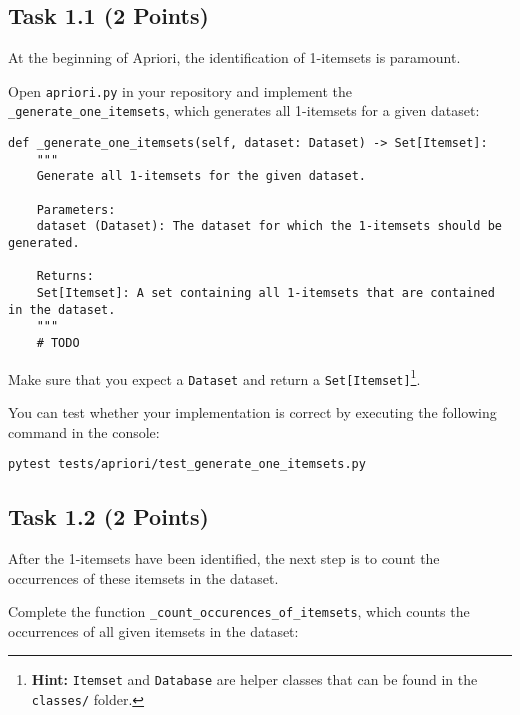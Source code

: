 \documentclass[
english,
smallborders
]{i6prcsht}
\newcommand{\points}[1]{\hfill \color{red}(#1 Points)\color{black}}
\begin{document}
\subsection*{Task 1.1 \points{2}}

At the beginning of Apriori, the identification of 1-itemsets is paramount.

Open \texttt{apriori.py} in your repository and implement the \texttt{\_generate\_one\_itemsets}, which generates all 1-itemsets for a given dataset:

\vspace*{0.3cm}

\begin{lstlisting}
def _generate_one_itemsets(self, dataset: Dataset) -> Set[Itemset]:
	"""
	Generate all 1-itemsets for the given dataset.

	Parameters:
	dataset (Dataset): The dataset for which the 1-itemsets should be generated.

	Returns:
	Set[Itemset]: A set containing all 1-itemsets that are contained in the dataset.
	"""
	# TODO
\end{lstlisting}

\vspace*{0.1cm}

Make sure that you expect a \texttt{Dataset} and return a \texttt{Set[Itemset]}\footnote{\textbf{Hint:} \texttt{Itemset} and \texttt{Database} are helper classes that can be found in the \texttt{classes/} folder.}.

You can test whether your implementation is correct by executing the following command in the console:

\vspace*{0.3cm}

\begin{lstlisting}
pytest tests/apriori/test_generate_one_itemsets.py
\end{lstlisting}

\vspace*{0.1cm}

\subsection*{Task 1.2 \points{2}}

After the 1-itemsets have been identified, the next step is to count the occurrences of these itemsets in the dataset.

Complete the function \texttt{\_count\_occurences\_of\_itemsets}, which counts the occurrences of all given itemsets in the dataset:
\end{document}
